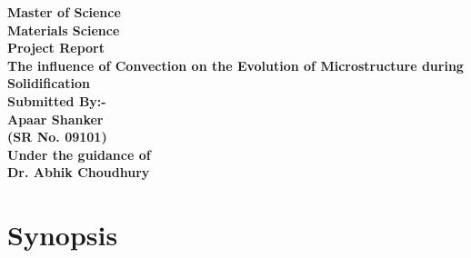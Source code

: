 \documentclass[12pt,a4paper]{report}
\begin{document}
\begin{titlepage}
\centering
\vspace{20pt}
\Large
\bfseries
Master of Science\\
Materials Science\\
\normalfont
\Large
\vspace{10pt}
Project Report\\
\vspace{100pt}
\LARGE
\bfseries
The influence of Convection on the Evolution of Microstructure 
during Solidification\\
\normalfont
\Large
\vspace{100pt}
Submitted By:-\\
Apaar Shanker\\
(SR No. 09101)\\
\vspace{20pt}
Under the guidance of\\ 
Dr. Abhik Choudhury
\end{titlepage}

{}
\tableofcontents



\chapter{Synopsis}
\end{document}

